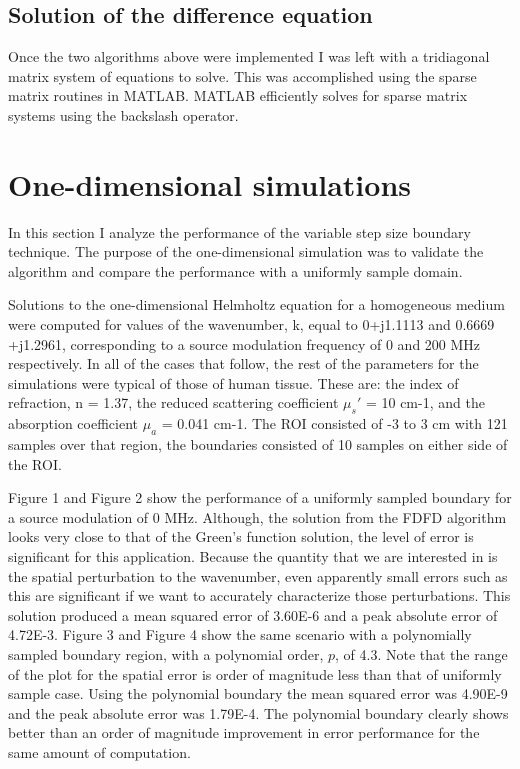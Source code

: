 \documentclass [11 pt, titlepage]{article}
\begin{document}
\subsection{Solution of the difference equation}
\vspace {-4ex}
Once the two algorithms above were implemented I was left with a
tridiagonal matrix system of equations to solve.  This was
accomplished using the sparse matrix routines in MATLAB.  MATLAB
efficiently solves for sparse matrix systems using the backslash operator.

\section{One-dimensional simulations}
\vspace {-4ex}
In this section I analyze the performance of the variable step size
boundary technique.  The purpose of the one-dimensional simulation was
to validate the algorithm and compare the performance with a uniformly
sample domain.

Solutions to the one-dimensional Helmholtz equation for a homogeneous
medium were computed for values of the wavenumber, k, equal to
0+j1.1113 and 0.6669 +j1.2961, corresponding to a source modulation
frequency of 0 and 200 MHz respectively.  In all of the cases that
follow, the rest of the parameters for the simulations were typical of
those of human tissue.  These are: the index of refraction, n = 1.37,
the reduced scattering coefficient $\mu_s'$ = 10 cm-1, and the absorption
coefficient $\mu_a$ = 0.041 cm-1.  The ROI consisted of -3 to 3 cm with
121 samples over that region, the boundaries consisted of 10 samples
on either side of the ROI.

Figure 1 and Figure 2 show the performance of a uniformly sampled
boundary for a source modulation of 0 MHz.  Although, the solution
from the FDFD algorithm looks very close to that of the Green's
function solution, the level of error is significant for this
application.  Because the quantity that we are interested in is the
spatial perturbation to the wavenumber, even apparently small errors
such as this are significant if we want to accurately characterize
those perturbations.  This solution produced a mean squared error of
3.60E-6 and a peak absolute error of 4.72E-3.  Figure 3 and Figure 4
show the same scenario with a polynomially sampled boundary region,
with a polynomial order, $p$, of 4.3.  Note that the range of the plot
for the spatial error is order of magnitude less than that of
uniformly sample case.  Using the polynomial boundary the mean squared
error was 4.90E-9 and the peak absolute error was 1.79E-4.  The
polynomial boundary clearly shows better than an order of magnitude
improvement in error performance for the same amount of computation.
\end{document}
